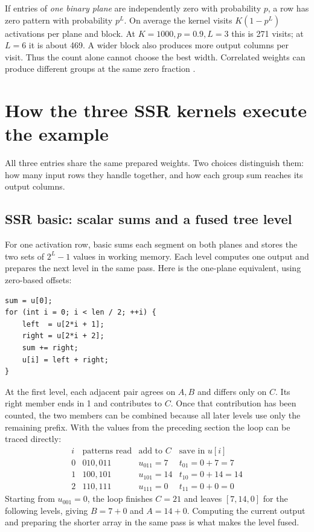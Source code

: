 \documentclass[11pt,a4paper]{article}
\begin{document}
If entries of \emph{one binary plane} are independently zero with probability
\(p\), a row has zero pattern with probability \(p^L\). On average the kernel
visits \(K(1-p^L)\) activations per plane and block. At \(K=1000,p=0.9,L=3\)
this is 271 visits; at \(L=6\) it is about 469. A wider block also produces
more output columns per visit. Thus the count alone cannot choose the best
width. Correlated weights can produce different groups at the same zero
fraction \cite{ssrpaper}.

\section{How the three SSR kernels execute the example}\label{sec:ssrcpu}
All three entries share the same prepared weights. Two choices distinguish
them: how many input rows they handle together, and how each group sum
reaches its output columns.

\subsection{SSR basic: scalar sums and a fused tree level}
For one activation row, basic sums each segment on both planes and stores
the two sets of \(2^L-1\) values in working memory. Each level computes one
output and prepares the next level in the same pass. Here is the one-plane
equivalent, using zero-based offsets:
\begin{lstlisting}
sum = u[0];
for (int i = 0; i < len / 2; ++i) {
    left  = u[2*i + 1];
    right = u[2*i + 2];
    sum += right;
    u[i] = left + right;
}
\end{lstlisting}
At the first level, each adjacent pair agrees on \(A,B\) and differs
only on \(C\). Its right member ends in 1 and contributes to \(C\).
Once that contribution has been counted, the two members can be combined
because all later levels use only the remaining prefix. With the values
from the preceding section the loop can be traced directly:
\[
\begin{array}{c|c|c|c}
i & \text{patterns read} & \text{add to }C & \text{save in }u[i]\\ \hline
0 & 010,011 & u_{011}=7 & t_{01}=0+7=7\\
1 & 100,101 & u_{101}=14 & t_{10}=0+14=14\\
2 & 110,111 & u_{111}=0 & t_{11}=0+0=0
\end{array}
\]
Starting from \(u_{001}=0\), the loop finishes \(C=21\) and leaves
\([7,14,0]\) for the following levels, giving \(B=7+0\) and \(A=14+0\).
Computing the current output and preparing the shorter array in the same
pass is what makes the level fused.
\end{document}
